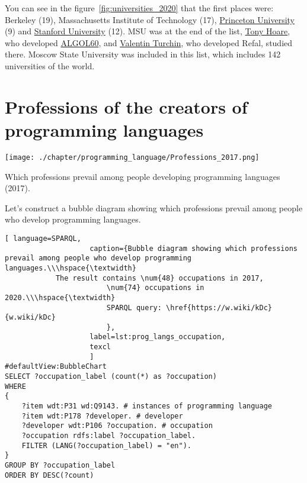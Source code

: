 You can see in the figure~\ref{fig:universities_2020} that the first places were: Berkeley (19), Massachusetts Institute of Technology (17), \href{https://en.wikipedia.org/wiki/Princeton_University}{Princeton University} (9) and \href{https://en.wikipedia.org/wiki/Stanford_University}{Stanford University} (12). MSU was at the end of the list, \href{https://en.wikipedia.org/wiki/Tony_Hoare}{Tony Hoare}, who developed \href{https://en.wikipedia.org/wiki/ALGOL}{ALGOL60}, and \href{https://en.wikipedia.org/wiki/Valentin_Turchin}{Valentin Turchin}, who developed Refal, studied there. Moscow State University was included in this list, which includes 142 universities of the world.

\section{Professions of the creators of programming languages}

\begin{marginfigure}[-5cm]
	\texttt{[image: ./chapter/programming\_language/Professions\_2017.png]}
	\caption{Which professions prevail among people developing programming languages (2017).}
	\label{fig:Professions_2017}
\end{marginfigure}

Let's construct a bubble diagram showing which professions prevail among people who develop programming languages.

\begin{lstlisting}[ language=SPARQL, 
                    caption={Bubble diagram showing which professions prevail among people who develop programming languages.\\\hspace{\textwidth}
			The result contains \num{48} occupations in 2017, 
                        \num{74} occupations in 2020.\\\hspace{\textwidth}
                        SPARQL query: \href{https://w.wiki/kDc}{w.wiki/kDc}
                        },
                    label=lst:prog_langs_occupation,
                    texcl 
                    ]
#defaultView:BubbleChart
SELECT ?occupation_label (count(*) as ?occupation)
WHERE
{
    ?item wdt:P31 wd:Q9143. # instances of programming language 
    ?item wdt:P178 ?developer. # developer
    ?developer wdt:P106 ?occupation. # occupation
    ?occupation rdfs:label ?occupation_label. 
    FILTER (LANG(?occupation_label) = "en"). 
}
GROUP BY ?occupation_label 
ORDER BY DESC(?count)
\end{lstlisting}%

